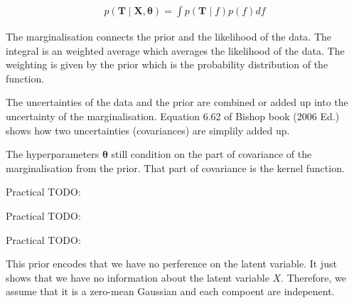 \documentclass[12pt]{article}
\newenvironment{question}[2][Question]{\begin{trivlist}
\kern10pt
\item[\hskip \labelsep {\bfseries #1}\hskip \labelsep {\bfseries #2.}]}{\end{trivlist}}
\begin{document}
\begin{question}{8}
\begin{align*}
  p(\mathbf{T} \mid \mathbf{X}, \bm{\theta}) = \int p(\mathbf{T}\mid f)p(f) df
\end{align*}

The marginalisation connects the prior and the likelihood of the data. The
 integral is an weighted average which averages the likelihood of the data.
 The weighting is given by the prior which is the probability distribution of
 the function.

The uncertainties of the data and the prior are combined or added up into the 
 uncertainty of the marginalisation. Equation 6.62 of Bishop book (2006 Ed.) shows
 how two uncertainties (covariances) are simplily added up.

The hyperparameters $\bm{\theta}$ still condition on the part of covariance of the 
 marginalisation from the prior. That part of covariance is the kernel function.
\end{question}

\begin{question}{9}
  Practical TODO:
\end{question}

\begin{question}{10}
  Practical TODO:
\end{question}

\begin{question}{11}
  Practical TODO:
\end{question}

\begin{question}{12}
This prior encodes that we have no perference on the latent variable. It just 
 shows that we have no information about the latent variable $X$. Therefore, 
 we assume that it is a zero-mean Gaussian and each compoent are indepenent.
\end{question}
\end{document}
